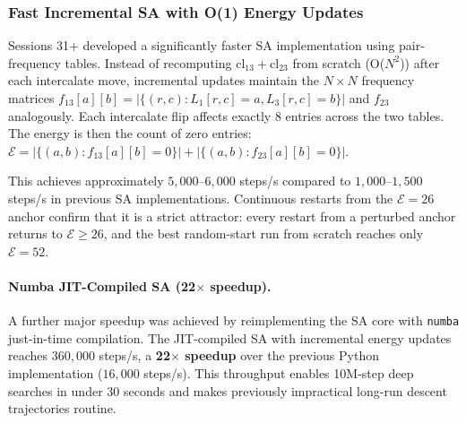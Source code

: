 \documentclass[11pt,a4paper]{article}
\theoremstyle{remark}
\newcommand{\cl}{\mathrm{cl}}
\newcommand{\E}{\mathcal{E}}
\begin{document}
\subsubsection{Fast Incremental SA with O(1) Energy Updates}

Sessions 31+ developed a significantly faster SA implementation using pair-frequency
tables. Instead of recomputing $\cl_{13} + \cl_{23}$ from scratch (O($N^2$)) after each
intercalate move, incremental updates maintain the $N \times N$ frequency matrices
$f_{13}[a][b] = |\{(r,c) : L_1[r,c]=a, L_3[r,c]=b\}|$ and $f_{23}$ analogously.
Each intercalate flip affects exactly 8 entries across the two tables. The energy is
then the count of zero entries: $\E = |\{(a,b) : f_{13}[a][b]=0\}| + |\{(a,b) : f_{23}[a][b]=0\}|$.

This achieves approximately $5{,}000$--$6{,}000$ steps/s compared to $1{,}000$--$1{,}500$
steps/s in previous SA implementations. Continuous restarts from the $\E=26$ anchor
confirm that it is a strict attractor: every restart from a perturbed anchor returns to
$\E \geq 26$, and the best random-start run from scratch reaches only $\E = 52$.

\paragraph{Numba JIT-Compiled SA (22$\times$ speedup).}
A further major speedup was achieved by reimplementing the SA core with \texttt{numba}
just-in-time compilation. The JIT-compiled SA with incremental energy updates reaches
$360{,}000$ steps/s, a \textbf{22$\times$ speedup} over the previous Python implementation
($16{,}000$ steps/s). This throughput enables 10M-step deep searches in under 30 seconds
and makes previously impractical long-run descent trajectories routine.
\end{document}
